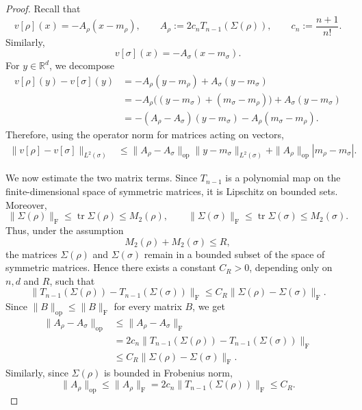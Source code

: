 \documentclass[11pt,reqno]{amsart}
\numberwithin{figure}{section}
\begin{document}
\begin{proof}
Recall that
\[
v[\rho](x)
=
-A_\rho(x-m_\rho),
\qquad
A_\rho:=
2c_nT_{n-1}(\Sigma(\rho)),
\qquad
c_n:=\frac{n+1}{n!}.
\]
Similarly,
\[
v[\sigma](x)
=
-A_\sigma(x-m_\sigma).
\]
For $y\in\mathbb R^d$, we decompose
\[
\begin{aligned}
v[\rho](y)-v[\sigma](y)
&=
-A_\rho(y-m_\rho)+A_\sigma(y-m_\sigma) \\
&=
-A_\rho\bigl((y-m_\sigma)+(m_\sigma-m_\rho)\bigr)
+A_\sigma(y-m_\sigma) \\
&=
-(A_\rho-A_\sigma)(y-m_\sigma)
-A_\rho(m_\sigma-m_\rho).
\end{aligned}
\]
Therefore, using the operator norm for matrices acting on vectors,
\[
\begin{aligned}
\|v[\rho]-v[\sigma]\|_{L^2(\sigma)}
&\le
\|A_\rho-A_\sigma\|_{\mathrm{op}}
\|y-m_\sigma\|_{L^2(\sigma)}
+
\|A_\rho\|_{\mathrm{op}}|m_\rho-m_\sigma|.
\end{aligned}
\]

We now estimate the two matrix terms. Since $T_{n-1}$ is a polynomial map on
the finite-dimensional space of symmetric matrices, it is Lipschitz on bounded
sets. Moreover,
\[
\|\Sigma(\rho)\|_{\mathrm F}
\le
\operatorname{tr}\Sigma(\rho)
\le
M_2(\rho),
\qquad
\|\Sigma(\sigma)\|_{\mathrm F}
\le
\operatorname{tr}\Sigma(\sigma)
\le
M_2(\sigma).
\]
Thus, under the assumption
\[
M_2(\rho)+M_2(\sigma)\le R,
\]
the matrices $\Sigma(\rho)$ and $\Sigma(\sigma)$ remain in a bounded subset of
the space of  symmetric matrices. Hence there exists a constant $C_R>0$, depending only
on $n,d$ and $R$, such that
\[
\|T_{n-1}(\Sigma(\rho))-T_{n-1}(\Sigma(\sigma))\|_{\mathrm F}
\le
C_R\|\Sigma(\rho)-\Sigma(\sigma)\|_{\mathrm F}.
\]
Since $\|B\|_{\mathrm{op}}\le \|B\|_{\mathrm F}$ for every matrix $B$, we get
\[
\begin{aligned}
\|A_\rho-A_\sigma\|_{\mathrm{op}}
&\le
\|A_\rho-A_\sigma\|_{\mathrm F} \\
&=
2c_n
\|T_{n-1}(\Sigma(\rho))-T_{n-1}(\Sigma(\sigma))\|_{\mathrm F} \\
&\le
C_R\|\Sigma(\rho)-\Sigma(\sigma)\|_{\mathrm F}.
\end{aligned}
\]
Similarly, since $\Sigma(\rho)$ is bounded in Frobenius norm,
\[
\|A_\rho\|_{\mathrm{op}}
\le
\|A_\rho\|_{\mathrm F}
=
2c_n\|T_{n-1}(\Sigma(\rho))\|_{\mathrm F}
\le
C_R.
\]


\end{proof}
\end{document}
